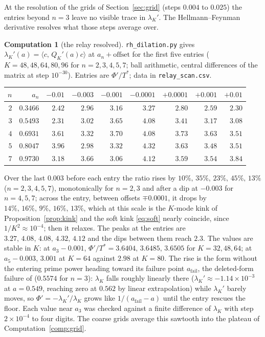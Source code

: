 \documentclass[11pt]{article}
\theoremstyle{definition}
\newtheorem{computation}[theorem]{Computation}
\theoremstyle{remark}
\newcommand{\ip}[2]{\langle #1,\, #2\rangle}
\newcommand{\Tst}{T^{*}}
\begin{document}
At the resolution of the grids of Section~\ref{sec:grid} (steps $0.004$ to $0.025$) the entries beyond $n=3$ leave no visible trace in $\lambda_K'$. The Hellmann--Feynman derivative resolves what those steps average over.

\begin{computation}[the relay resolved]\label{comp:relay}
\texttt{rh\_dilation.py} gives $\lambda_K'(a)=\ip{c}{Q_K'(a)c}$ at $a_n+\text{offset}$ for the first five entries ($K=48,48,64,80,96$ for $n=2,3,4,5,7$; ball arithmetic, central differences of the matrix at step $10^{-30}$). Entries are $\Phi'/\Tst$; data in \texttt{relay\_scan.csv}.
\begin{center}
\begin{tabular}{@{}rrrrrrrrr@{}}
\toprule
$n$ & $a_n$ & $-0.01$ & $-0.003$ & $-0.001$ & $-0.0001$ & $+0.0001$ & $+0.001$ & $+0.01$\\
\midrule
$2$ & $0.3466$ & $2.42$ & $2.96$ & $3.16$ & $3.27$ & $2.80$ & $2.59$ & $2.30$\\
$3$ & $0.5493$ & $2.31$ & $3.02$ & $3.65$ & $4.08$ & $3.41$ & $3.17$ & $3.08$\\
$4$ & $0.6931$ & $3.61$ & $3.32$ & $3.70$ & $4.08$ & $3.73$ & $3.63$ & $3.51$\\
$5$ & $0.8047$ & $3.96$ & $2.98$ & $3.32$ & $4.32$ & $3.63$ & $3.48$ & $3.51$\\
$7$ & $0.9730$ & $3.18$ & $3.66$ & $3.06$ & $4.12$ & $3.59$ & $3.54$ & $3.84$\\
\bottomrule
\end{tabular}
\end{center}
Over the last $0.003$ before each entry the ratio rises by $10\%,\,35\%,\,23\%,\,45\%,\,13\%$ ($n=2,3,4,5,7$), monotonically for $n=2,3$ and after a dip at $-0.003$ for $n=4,5,7$; across the entry, between offsets $\mp0.0001$, it drops by $14\%,\,16\%,\,9\%,\,16\%,\,13\%$, which at this scale is the $K$-mode kink of Proposition~\ref{prop:kink} and the soft kink \eqref{eq:soft} nearly coincide, since $1/K^2\approx10^{-4}$; then it relaxes. The peaks at the entries are $3.27,\,4.08,\,4.08,\,4.32,\,4.12$ and the dips between them reach $2.3$. The values are stable in $K$: at $a_3-0.001$, $\Phi'/\Tst=3.6404,\,3.6485,\,3.6505$ for $K=32,48,64$; at $a_5-0.003$, $3.001$ at $K=64$ against $2.98$ at $K=80$. The rise is the form without the entering prime power heading toward its failure point $a_{\mathrm{fail}}$, the deleted-form failure of \cite{michaels-folds} ($0.5574$ for $n=3$): $\lambda_K$ falls roughly linearly there ($\lambda_K'\approx-1.14\times10^{-3}$ at $a=0.549$, reaching zero at $0.562$ by linear extrapolation) while $\lambda_K'$ barely moves, so $\Phi'=-\lambda_K'/\lambda_K$ grows like $1/(a_{\mathrm{fail}}-a)$ until the entry rescues the floor. Each value near $a_3$ was checked against a finite difference of $\lambda_K$ with step $2\times10^{-4}$ to four digits. The coarse grids average this sawtooth into the plateau of Computation~\ref{comp:grid}.
\end{computation}
\end{document}
